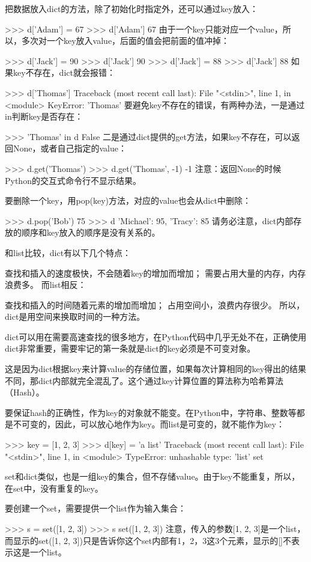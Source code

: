 把数据放入dict的方法，除了初始化时指定外，还可以通过key放入：

>>> d['Adam'] = 67
>>> d['Adam']
67
由于一个key只能对应一个value，所以，多次对一个key放入value，后面的值会把前面的值冲掉：

>>> d['Jack'] = 90
>>> d['Jack']
90
>>> d['Jack'] = 88
>>> d['Jack']
88
如果key不存在，dict就会报错：

>>> d['Thomas']
Traceback (most recent call last):
  File "<stdin>", line 1, in <module>
KeyError: 'Thomas'
要避免key不存在的错误，有两种办法，一是通过in判断key是否存在：

>>> 'Thomas' in d
False
二是通过dict提供的get方法，如果key不存在，可以返回None，或者自己指定的value：

>>> d.get('Thomas')
>>> d.get('Thomas', -1)
-1
注意：返回None的时候Python的交互式命令行不显示结果。

要删除一个key，用pop(key)方法，对应的value也会从dict中删除：

>>> d.pop('Bob')
75
>>> d
{'Michael': 95, 'Tracy': 85}
请务必注意，dict内部存放的顺序和key放入的顺序是没有关系的。

和list比较，dict有以下几个特点：

查找和插入的速度极快，不会随着key的增加而增加；
需要占用大量的内存，内存浪费多。
而list相反：

查找和插入的时间随着元素的增加而增加；
占用空间小，浪费内存很少。
所以，dict是用空间来换取时间的一种方法。

dict可以用在需要高速查找的很多地方，在Python代码中几乎无处不在，正确使用dict非常重要，需要牢记的第一条就是dict的key必须是不可变对象。

这是因为dict根据key来计算value的存储位置，如果每次计算相同的key得出的结果不同，那dict内部就完全混乱了。这个通过key计算位置的算法称为哈希算法（Hash）。

要保证hash的正确性，作为key的对象就不能变。在Python中，字符串、整数等都是不可变的，因此，可以放心地作为key。而list是可变的，就不能作为key：

>>> key = [1, 2, 3]
>>> d[key] = 'a list'
Traceback (most recent call last):
  File "<stdin>", line 1, in <module>
TypeError: unhashable type: 'list'
set

set和dict类似，也是一组key的集合，但不存储value。由于key不能重复，所以，在set中，没有重复的key。

要创建一个set，需要提供一个list作为输入集合：

>>> s = set([1, 2, 3])
>>> s
set([1, 2, 3])
注意，传入的参数[1, 2, 3]是一个list，而显示的set([1, 2, 3])只是告诉你这个set内部有1，2，3这3个元素，显示的[]不表示这是一个list。

